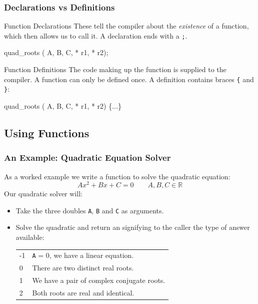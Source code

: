 \documentclass[smaller,table]{beamer}
\begin{document}
\begin{frame}[fragile]
\frametitle{Declarations vs Definitions}
\begin{block}{Function Declarations}
These tell the compiler about the \emph{existence} of a function, which then
allows us to call it. A declaration ends with a {\tt ;}.
\begin{semiverbatim}
 quad_roots ( A,  B,  C,
                 * r1,  * r2);
\end{semiverbatim}
\end{block}

\begin{block}{Function Definitions}
The code making up the function is supplied to the compiler. A function can only be defined once. A definition contains braces {\tt \{} and {\tt \}}:
\begin{semiverbatim}
 quad_roots ( A,  B,  C,
                 * r1,  * r2)
\{...\}
\end{semiverbatim}
\end{block}
\end{frame}

\subsection{Using Functions}
\begin{frame}
\frametitle{An Example: Quadratic Equation Solver}
As a worked example we write a function to solve the quadratic equation:
$$ A x^2 + B x + C=0 \qquad A,B,C\in\mathbb{R}$$
Our quadratic solver will:
\begin{itemize}
\item Take the three doubles {\tt A}, {\tt B} and {\tt C} as arguments.
\item Solve the quadratic and return an  signifying to the caller the type of answer available:
\begin{tabular}{l l}
-1&{\tt A} = 0, we have a linear equation.\\
0&There are two distinct real roots.\\
1&We have a pair of complex conjugate roots.\\
2&Both roots are real and identical.
\end{tabular}
\end{itemize}
\end{frame}
\end{document}
